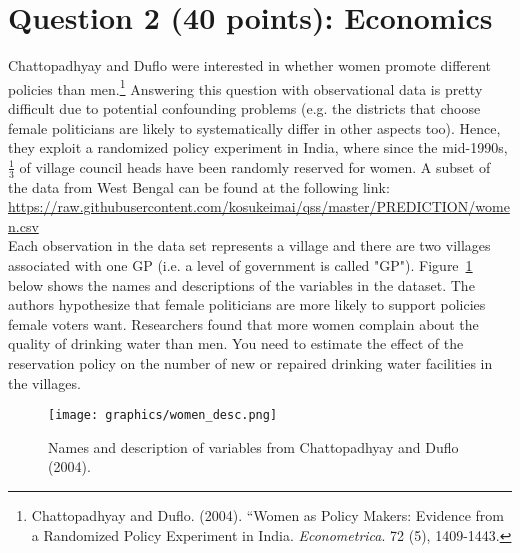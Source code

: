 \documentclass[12pt,letterpaper]{article}
\begin{document}
\newpage

\section*{Question 2 (40 points): Economics}

Chattopadhyay and Duflo were interested in whether women promote different policies than men.\footnote{Chattopadhyay and Duflo. (2004). ``Women as Policy Makers: Evidence from a Randomized Policy Experiment in India. \textit{Econometrica}. 72 (5), 1409-1443.} Answering this question with observational data is pretty difficult due to potential confounding problems (e.g. the districts that choose female politicians are likely to systematically differ in other aspects too). Hence, they exploit a randomized policy experiment in India, where since the mid-1990s, $\frac{1}{3}$ of village council heads have been randomly reserved for women. A subset of the data from West Bengal can be found at the following link: \url{https://raw.githubusercontent.com/kosukeimai/qss/master/PREDICTION/women.csv}\\

\noindent Each observation in the data set represents a village and there are two villages associated with one GP (i.e. a level of government is called "GP"). Figure~\ref{fig:women_desc}
below shows the names and descriptions of the variables in the dataset. The authors hypothesize that female politicians are more likely to support policies female voters want. Researchers found that more women complain about the quality of drinking water than men. You need to estimate the effect of the reservation policy on the number of new or repaired drinking water facilities in the villages.
\vspace{.5cm}
\begin{figure}[h!]
	\caption{\footnotesize{Names and description of variables from Chattopadhyay and Duflo (2004).}}
	\vspace{.5cm}
	\centering
	\label{fig:women_desc}
	\texttt{[image: graphics/women\_desc.png]}
\end{figure}		

\newpage
\end{document}
